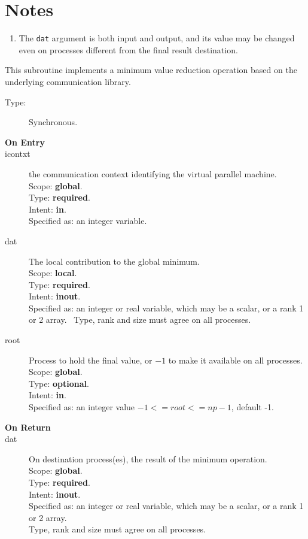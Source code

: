 \section*{Notes}
\begin{enumerate}
\item The \verb|dat| argument is both input and output, and its
  value may be changed even on processes different from the final
  result destination.
\end{enumerate}



This subroutine implements a minimum value reduction
operation based on the underlying communication library. 
\begin{description}
\item[Type:] Synchronous.
\item[\bf  On Entry ]
\item[icontxt] the communication context identifying the virtual
  parallel machine.\\
Scope: {\bf global}.\\
Type: {\bf required}.\\
Intent: {\bf in}.\\
Specified as: an integer variable.
\item[dat] The local contribution to the global minimum.\\
Scope: {\bf local}.\\
Type: {\bf required}.\\
Intent: {\bf inout}.\\
Specified as: an integer  or real variable, which may be a
scalar, or a rank 1 or 2 array. \
Type, rank and size must agree on all processes.
\item[root] Process to hold the final value, or $-1$ to make it available
  on all processes.\\
Scope: {\bf global}.\\
Type: {\bf optional}.\\
Intent: {\bf in}.\\
Specified as: an integer value $-1<= root <= np-1$, default -1. \\
\end{description}


\begin{description}
\item[\bf On Return]
\item[dat] On destination process(es), the result of the minimum operation.\\
Scope: {\bf global}.\\
Type: {\bf required}.\\
Intent: {\bf inout}.\\
Specified as: an integer  or  real variable, which may be a
scalar, or a rank 1 or 2 array. \\
Type, rank and size must agree on all processes.
\end{description}


